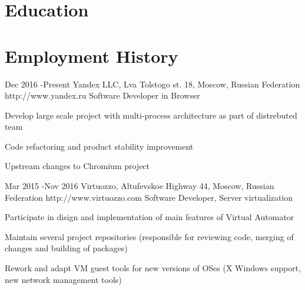 \documentclass[10pt]{article} %
\begin{document}
\section{Education}



\section{Employment History}

\job
{Dec 2016 -}{Present}
{Yandex LLC, Lva Tolstogo st. 18, Moscow, Russian Federation}
{http://www.yandex.ru}
{Software Developer in Browser}
{
\begin{itemize-noindent}
\setlength\itemsep{0em}
\item{Develop large scale project with multi-process architecture as part of distrebuted team}
\item{Code refactoring and product stability improvement}
\item{Upstream changes to Chromium project}
\end{itemize-noindent}
}


\job
{Mar 2015 -}{Nov 2016}
{Virtuozzo, Altufevskoe Highway 44, Moscow, Russian Federation}
{http://www.virtuozzo.com}
{Software Developer, Server virtualization}
{
\begin{itemize-noindent}
\setlength\itemsep{0em}
\item{Participate in disign and implementation of main features of Virtual Automator}
\item{Maintain several project repositories (responsible for reviewing code, merging of changes and building of packages)}
\item{Rework and adapt VM guest tools for new versions of OSes (X Windows support, new network management tools)}
\end{itemize-noindent}
}
\end{document}
